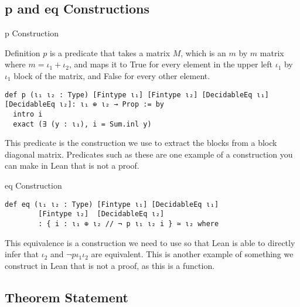 \documentclass[svgnames]{beamer}
\begin{document}
\subsection{p and eq Constructions}

\begin{frame}[label={sec:o},fragile]{p Construction}
\begin{block}{Definition}
$p$ is a predicate that takes a matrix $M$, which is an $m$ by $m$ matrix where $m = \iota_1 + \iota_2$, and maps it to True for every element in the upper left $\iota_1$ by $\iota_1$ block of the matrix, and False for every other element.
\end{block}

{\scriptsize
\begin{verbatim}
def p (ι₁ ι₂ : Type) [Fintype ι₁] [Fintype ι₂] [DecidableEq ι₁] 
[DecidableEq ι₂]: ι₁ ⊕ ι₂ → Prop := by
  intro i
  exact (∃ (y : ι₁), i = Sum.inl y)
\end{verbatim}
}
This predicate is the construction we use to extract the blocks from a block diagonal matrix. 
Predicates such as these are one example of a construction you can make in Lean that is not a proof. 

\end{frame}

\begin{frame}[label={sec:o},fragile]{eq Construction}

{\scriptsize
\begin{verbatim}
def eq (ι₁ ι₂ : Type) [Fintype ι₁] [DecidableEq ι₁]
        [Fintype ι₂]  [DecidableEq ι₂]
        : { i : ι₁ ⊕ ι₂ // ¬ p ι₁ ι₂ i } ≃ ι₂ where
\end{verbatim}
}
This equivalence is a construction we need to use so that Lean is able to directly infer that $\iota_2$ and $\neg p \iota_1 \iota_2$ are equivalent.
This is another example of something we construct in Lean that is not a proof, as this is a function.

\end{frame}

\subsection{Theorem Statement}
\end{document}

